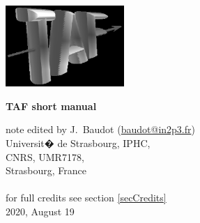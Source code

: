 \documentclass[a4paper, 12pt, twoside]{article}
\begin{document}
\sloppy


\begin{minipage}{.3\linewidth}
\begin{flushleft}
\includegraphics*[width=45mm]{logoTAF.eps}\\
\end{flushleft}
\end{minipage}
\begin{minipage}{.65\linewidth}
\begin{flushleft}
\Large{\bf TAF short manual}
\end{flushleft}
\begin{flushright}
note edited by J.~Baudot (\href{mailto:baudot@in2p3.fr}{baudot@in2p3.fr})\\
Universit� de Strasbourg, IPHC, \\
CNRS, UMR7178,\\
Strasbourg, France\\
\hspace{1 cm} \\
for full credits see section \ref {secCredits}\\
\vspace*{.2cm}
2020, August 19
\end{flushright}
\end{minipage}

\vspace{.5cm}

\tableofcontents
\end{document}
